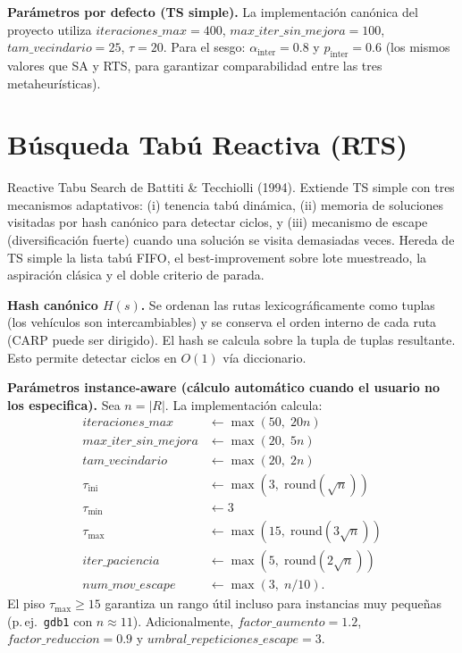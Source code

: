 \documentclass[12pt, a4paper]{article}
\begin{document}
\bigskip
\noindent
\textbf{Parámetros por defecto (TS simple).} La implementación canónica del
proyecto utiliza $\mathit{iteraciones\_max} = 400$,
$\mathit{max\_iter\_sin\_mejora} = 100$, $\mathit{tam\_vecindario} = 25$,
$\tau = 20$. Para el sesgo: $\alpha_{\mathrm{inter}} = 0.8$ y
$p_{\mathrm{inter}} = 0.6$ (los mismos valores que SA y RTS, para garantizar
comparabilidad entre las tres metaheurísticas).

\section{Búsqueda Tabú Reactiva (RTS)}

Reactive Tabu Search de Battiti \& Tecchiolli (1994). Extiende TS simple con
tres mecanismos adaptativos: (i) tenencia tabú dinámica, (ii) memoria de
soluciones visitadas por hash canónico para detectar ciclos, y
(iii) mecanismo de escape (diversificación fuerte) cuando una solución se
visita demasiadas veces. Hereda de TS simple la lista tabú FIFO, el
best-improvement sobre lote muestreado, la aspiración clásica y el doble
criterio de parada.

\medskip
\noindent
\textbf{Hash canónico $H(s)$.} Se ordenan las rutas lexicográficamente como
tuplas (los vehículos son intercambiables) y se conserva el orden interno de
cada ruta (CARP puede ser dirigido). El hash se calcula sobre la tupla de
tuplas resultante. Esto permite detectar ciclos en $O(1)$ vía diccionario.

\medskip
\noindent
\textbf{Parámetros instance-aware (cálculo automático cuando el usuario no
los especifica).} Sea $n = |R|$. La implementación calcula:
\[
\begin{aligned}
  \mathit{iteraciones\_max}     &\leftarrow \max(50,\; 20 n) \\
  \mathit{max\_iter\_sin\_mejora} &\leftarrow \max(20,\; 5 n) \\
  \mathit{tam\_vecindario}      &\leftarrow \max(20,\; 2 n) \\
  \tau_{\mathrm{ini}}            &\leftarrow \max(3,\; \mathrm{round}(\sqrt{n})) \\
  \tau_{\min}                    &\leftarrow 3 \\
  \tau_{\max}                    &\leftarrow \max(15,\; \mathrm{round}(3\sqrt{n})) \\
  \mathit{iter\_paciencia}       &\leftarrow \max(5,\; \mathrm{round}(2\sqrt{n})) \\
  \mathit{num\_mov\_escape}      &\leftarrow \max(3,\; n/10).
\end{aligned}
\]
El piso $\tau_{\max} \geq 15$ garantiza un rango útil incluso para instancias
muy pequeñas (p.\,ej.\ \texttt{gdb1} con $n \approx 11$). Adicionalmente,
$\mathit{factor\_aumento} = 1.2$, $\mathit{factor\_reduccion} = 0.9$ y
$\mathit{umbral\_repeticiones\_escape} = 3$.
\end{document}
